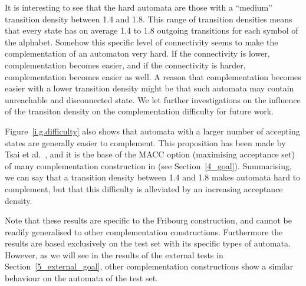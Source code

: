 It is interesting to see that the hard automata are those with a ``medium'' transition density between 1.4 and 1.8. This range of transition densities means that every state has on average 1.4 to 1.8 outgoing transitions for each symbol of the alphabet. Somehow this specific level of connectivity seems to make the complementation of an automaton very hard. If the connectivity is lower, complementation becomes easier, and if the connectivity is harder, complementation becomes easier as well. A reason that complementation becomes easier with a lower transition density might be that such automata may contain unreachable and disconnected state. We let further investigations on the influence of the transiton density on the complementation difficulty for future work.

Figure~\ref{i.g.difficulty} also shows that automata with a larger number of accepting states are generally easier to complement. This proposition has been made by Tsai et al.~\cite{2011_tsai}, and it is the base of the MACC option (maximising acceptance set) of many complementation construction in \goal{} (see Section~\ref{4_goal}). Summarising, we can say that a transition density between 1.4 and 1.8 makes automata hard to complement, but that this difficulty is alleviated by an increasing acceptance density.

Note that these results are specific to the Fribourg construction, and cannot be readily generalised to other complementation constructions. Furthermore the results are based exclusively on the \goal{} test set with its specific types of automata. However, as we will see in the results of the external tests in Section~\ref{5_external_goal}, other complementation constructions show a similar behaviour on the automata of the \goal{} test set.



